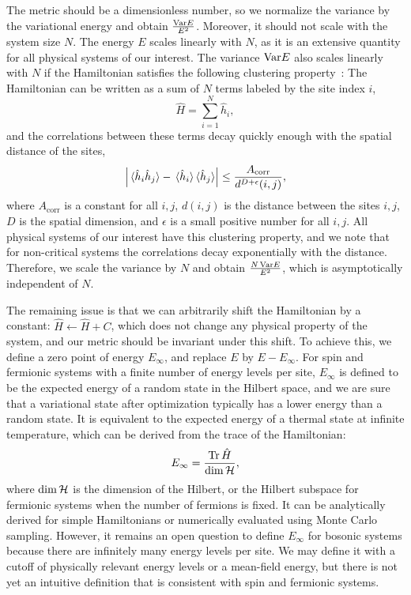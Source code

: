 The metric should be a dimensionless number, so we normalize the variance by the variational energy and obtain $\frac{\mathrm{Var} E}{E^2}$. Moreover, it should not scale with the system size $N$. The energy $E$ scales linearly with $N$, as it is an extensive quantity for all physical systems of our interest. The variance $\mathrm{Var} E$ also scales linearly with $N$ if the Hamiltonian satisfies the following clustering property~\cite{park1995uniqueness, nachtergaele2006lieb, hastings2006spectral}: The Hamiltonian can be written as a sum of $N$ terms labeled by the site index $i$,
\begin{equation}
\hat{H} = \sum_{i = 1}^N \hat{h}_i,
\end{equation}
and the correlations between these terms decay quickly enough with the spatial distance of the sites,
\begin{equation}
\left| \ev*{\hat{h}_i \hat{h}_j} - \ev*{\hat{h}_i}\!\ev*{\hat{h}_j} \right| \le \frac{A_\text{corr}}{d^{D + \epsilon}(i, j)},
\end{equation}
where $A_\text{corr}$ is a constant for all $i, j$, $d(i, j)$ is the distance between the sites $i, j$, $D$ is the spatial dimension, and $\epsilon$ is a small positive number for all $i, j$. All physical systems of our interest have this clustering property, and we note that for non-critical systems the correlations decay exponentially with the distance. Therefore, we scale the variance by $N$ and obtain $\frac{N\,\mathrm{Var} E}{E^2}$, which is asymptotically independent of $N$.

The remaining issue is that we can arbitrarily shift the Hamiltonian by a constant: $\hat{H} \gets \hat{H} + C$, which does not change any physical property of the system, and our metric should be invariant under this shift. To achieve this, we define a zero point of energy $E_\infty$, and replace $E$ by $E - E_\infty$. For spin and fermionic systems with a finite number of energy levels per site, $E_\infty$ is defined to be the expected energy of a random state in the Hilbert space, and we are sure that a variational state after optimization typically has a lower energy than a random state. It is equivalent to the expected energy of a thermal state at infinite temperature, which can be derived from the trace of the Hamiltonian:
\begin{equation}
E_\infty = \frac{\Tr \hat{H}}{\dim \mathcal{H}},
\label{eq:E-infty-trace}
\end{equation}
where $\dim \mathcal{H}$ is the dimension of the Hilbert, or the Hilbert subspace for fermionic systems when the number of fermions is fixed. It can be analytically derived for simple Hamiltonians or numerically evaluated using Monte Carlo sampling. However, it remains an open question to define $E_\infty$ for bosonic systems because there are infinitely many energy levels per site. We may define it with a cutoff of physically relevant energy levels or a mean-field energy, but there is not yet an intuitive definition that is consistent with spin and fermionic systems.

